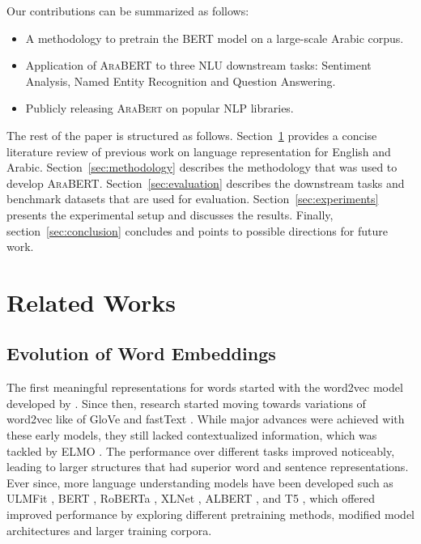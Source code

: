 \documentclass[10pt, a4paper]{article}
\begin{document}
Our contributions can be summarized as follows:
\begin{itemize}
    \item A methodology to pretrain the BERT model on a large-scale Arabic corpus.
    \item Application of \textsc{AraBERT} to three NLU downstream tasks: Sentiment Analysis, Named Entity Recognition and Question Answering.
    \item Publicly releasing \textsc{AraBert} on popular NLP libraries.
\end{itemize}

The rest of the paper is structured as follows.  Section~\ref{sec:related_work} provides a concise literature review of previous work on language representation for English and Arabic.  Section~\ref{sec:methodology} describes the methodology that was used to develop \textsc{AraBERT}.  Section~\ref{sec:evaluation} describes the downstream tasks and benchmark datasets that are used for evaluation.  Section~\ref{sec:experiments} presents the experimental setup and discusses the results.  Finally, section~\ref{sec:conclusion} concludes and points to possible directions for future work.
 \section{Related Works}
\label{sec:related_work}

\subsection{Evolution of Word Embeddings}
The first meaningful representations for words started with the word2vec model developed by \cite{mikolov2013distributed}. Since then, research started moving towards variations of word2vec like of GloVe \cite{pennington2014glove} and fastText \cite{mikolov2017advances}. While major advances were achieved with these early models, they still lacked contextualized information, which was tackled by ELMO \cite{peters2018deep}. The performance over different tasks improved noticeably, leading to larger structures that had superior word and sentence representations. Ever since, more language understanding models have been developed such as ULMFit \cite{howard2018universal}, BERT \cite{devlin2018bert}, RoBERTa \cite{liu2019roberta}, XLNet \cite{yang2019xlnet}, ALBERT \cite{lan2019albert}, and T5 \cite{raffel2019exploring}, which offered improved performance by exploring different pretraining methods, modified model architectures and larger training corpora.
\end{document}
